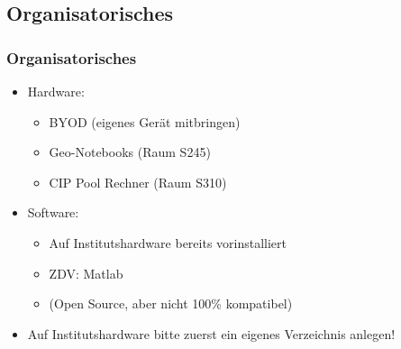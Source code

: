    \subsection{Organisatorisches}
    \begin{frame}
        \frametitle{Organisatorisches}

        \vspace{-1.0cm}

        \begin{itemize}
          \item Hardware:

          \begin{itemize}
            \itemsep0.3cm
            \item BYOD (eigenes Gerät mitbringen)
            \item Geo-Notebooks (Raum S245)
            \item CIP Pool Rechner (Raum S310)
          \end{itemize}

          \item Software:

          \begin{itemize}
            \itemsep0.3cm
            \item Auf Institutshardware bereits vorinstalliert
            \item ZDV: Matlab 
            \item {} (Open Source, aber nicht 100\% kompatibel)
          \end{itemize}

          \item \alert{Auf Institutshardware bitte zuerst ein eigenes Verzeichnis anlegen!}

        \end{itemize}
    \end{frame}

